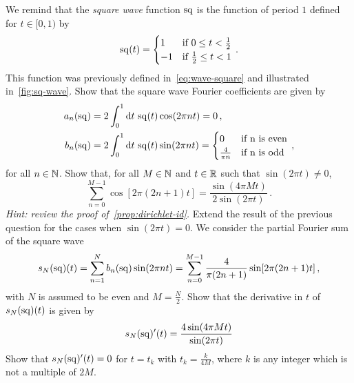 \begin{Exercise}[title={Gibbs Phenomenon for the square wave},name={Problem},label=gibbs]
  We remind that the \emph{square wave} function $\operatorname{sq}$ is the function of period $1$ defined
  for $t\in[0,1)$ by
  \begin{equation}
    \operatorname{sq}(t)=
    \begin{cases}
      1&\text{if}~0\leq t <\frac{1}{2}\\
      -1&\text{if}~\frac{1}{2}\leq t < 1
    \end{cases}\,.
  \end{equation}
  This function was previously defined in~\cref{eq:wave-square} and illustrated
  in~\cref{fig:sq-wave}.
  \Question Show that the square wave Fourier coefficients are given by
  \begin{align}
    a_n(\sq)&=2\int_0^1\diff t\,\sq(t)\cos(2\pi nt)=0\,,\\
    b_n(\sq)&=2\int_0^1\diff t\,\sq(t)\sin(2\pi nt)=
    \begin{cases}
      0&\text{if}~$n$~\text{is even}\\
      \frac{4}{\pi n}&\text{if}~$n$~\text{is odd}
    \end{cases}\,,
  \end{align}
  for all $n\in\mathbb{N}$.
  \Question Show that, for all $M\in\mathbb{N}$ and $t\in\mathbb{R}$ such that $\sin(2\pi t)\neq 0$,
  \begin{equation}
    \sum_{n=0}^{M-1}\cos[2\pi(2n+1)t]=\frac{\sin(4\pi Mt)}{2\sin(2\pi t)}\,.
  \end{equation}
  \emph{Hint: review the proof of~\cref{prop:dirichlet-id}.}
  \Question Extend the result of the previous question for the cases when $\sin(2\pi t)=0$.
  \Question We consider the partial Fourier sum of the square wave
  \begin{equation}
    s_{N}(\operatorname{sq})(t)=\sum_{n=1}^N b_n(\operatorname{sq})\sin(2\pi n t)=\sum_{n=0}^{M-1}\frac{4}{\pi(2n+1)}\sin[2\pi(2n+1)t]\,,
  \end{equation}
  with $N$ is assumed to be even and $M=\frac{N}{2}$.
  \subQuestion Show that the derivative in $t$ of $s_{N}(\operatorname{sq})(t)$ is given by
  \begin{equation}
    s_{N}(\operatorname{sq})'(t)=\frac{4\sin(4\pi Mt)}{\sin(2\pi t)}
  \end{equation}
  \subQuestion Show that $s_{N}(\operatorname{sq})'(t)=0$ for $t=t_k$ with $t_k=\frac{k}{4M}$,
  where $k$ is any integer which is not a multiple of $2M$.

\end{Exercise}
